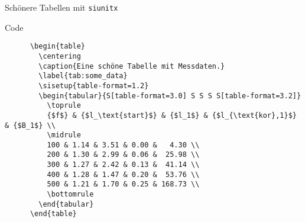\begin{frame}[fragile]{
  Schönere Tabellen mit \texttt{siunitx}
  \hfill
}
  \fontsize{8}{6}
  \begin{block}{Code}
    \begin{verbatim}
      \begin{table}
        \centering
        \caption{Eine schöne Tabelle mit Messdaten.}
        \label{tab:some_data}
        \sisetup{table-format=1.2}
        \begin{tabular}{S[table-format=3.0] S S S S[table-format=3.2]}
          \toprule
          {$f$} & {$l_\text{start}$} & {$l_1$} & {$l_{\text{kor},1}$} & {$B_1$} \\
          \midrule
          100 & 1.14 & 3.51 & 0.00 &   4.30 \\
          200 & 1.30 & 2.99 & 0.06 &  25.98 \\
          300 & 1.27 & 2.42 & 0.13 &  41.14 \\
          400 & 1.28 & 1.47 & 0.20 &  53.76 \\
          500 & 1.21 & 1.70 & 0.25 & 168.73 \\
          \bottomrule
        \end{tabular}
      \end{table}
    \end{verbatim}
  \end{block}
\end{frame}

